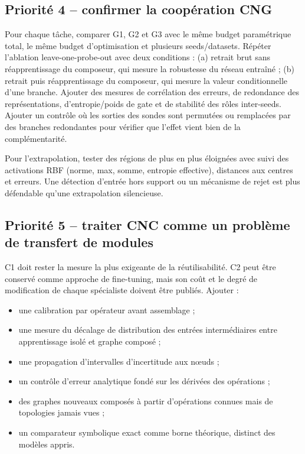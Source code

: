 \documentclass[11pt,a4paper]{article}
\begin{document}
\subsection{Priorité 4 -- confirmer la coopération CNG}

Pour chaque tâche, comparer G1, G2 et G3 avec le même budget paramétrique total, le même budget d'optimisation et plusieurs seeds/datasets. Répéter l'ablation leave-one-probe-out avec deux conditions : (a) retrait brut sans réapprentissage du composeur, qui mesure la robustesse du réseau entraîné ; (b) retrait puis réapprentissage du composeur, qui mesure la valeur conditionnelle d'une branche. Ajouter des mesures de corrélation des erreurs, de redondance des représentations, d'entropie/poids de gate et de stabilité des rôles inter-seeds. Ajouter un contrôle où les sorties des sondes sont permutées ou remplacées par des branches redondantes pour vérifier que l'effet vient bien de la complémentarité.

Pour l'extrapolation, tester des régions de plus en plus éloignées avec suivi des activations RBF (norme, max, somme, entropie effective), distances aux centres et erreurs. Une détection d'entrée hors support ou un mécanisme de rejet est plus défendable qu'une extrapolation silencieuse.

\subsection{Priorité 5 -- traiter CNC comme un problème de transfert de modules}

C1 doit rester la mesure la plus exigeante de la réutilisabilité. C2 peut être conservé comme approche de fine-tuning, mais son coût et le degré de modification de chaque spécialiste doivent être publiés. Ajouter :
\begin{itemize}
  \item une calibration par opérateur avant assemblage ;
  \item une mesure du décalage de distribution des entrées intermédiaires entre apprentissage isolé et graphe composé ;
  \item une propagation d'intervalles d'incertitude aux nœuds ;
  \item un contrôle d'erreur analytique fondé sur les dérivées des opérations ;
  \item des graphes nouveaux composés à partir d'opérations connues mais de topologies jamais vues ;
  \item un comparateur symbolique exact comme borne théorique, distinct des modèles appris.
\end{itemize}
\end{document}
